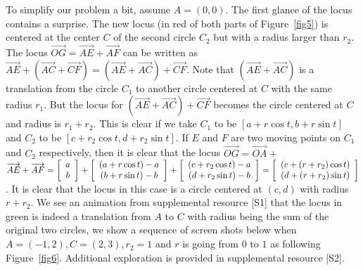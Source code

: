 \documentclass[12pt,a4paper]{article}%
\begin{document}
To simplify our problem a bit, assume $A=(0,0)$. The first
glance of the locus contains a surprise. The new locus (in red of both
parts of Figure~\ref{fig5})
is centered at the center $C$ of the second circle $C_2$ but with a
radius larger than $r_2$. The locus $\overrightarrow{OG}=\overrightarrow
{AE}+\overrightarrow{AF}$ can be written as $\overrightarrow{AE}+\left(
\overrightarrow{AC}+\overrightarrow{CF}\right)  =\left(  \overrightarrow
{AE}+\overrightarrow{AC}\right)  +\overrightarrow{CF}$. Note that $\left(
\overrightarrow{AE}+\overrightarrow{AC}\right)$ is a translation from the
circle $C_{1}$ to another circle centered at $C$ with the same radius $r_{1}$.
But the locus for $\left(  \overrightarrow{AE}+\overrightarrow{AC}\right)
+\overrightarrow{CF}$ becomes the circle centered at $C$ and radius is
$r_{1}+r_{2}$. This is clear if we take $C_{1}$ to be $[a+r\cos t, b+r\sin t]$ and
$C_{2}$ to be $[c+r_{2}\cos t, d+r_{2}\sin t]$. If $E$ and $F$ are two moving
points on $C_{1}$ and $C_{2}$ respectively, then it is clear that the locus
$\overrightarrow{OG}=\overrightarrow{OA}+$ $\overrightarrow{AE}+\overrightarrow{AF}
=\left[
\begin{array}
[c]{c}%
a\\
b
\end{array}
\right]  +\left[
\begin{array}
[c]{c}%
\left(  a+r\cos t\right)  -a\\
\left(  b+r\sin t\right)  -b
\end{array}
\right]  +\left[
\begin{array}
[c]{c}%
\left(  c+r_{2}\cos t\right)  -a\\
\left(  d+r_{2}\sin t\right)  -b
\end{array}
\right]  =\left[
\begin{array}
[c]{c}%
\left(  c+\left(  r+r_{2}\right)  \cos t\right) \\
\left(  d+\left(  r+r_{2}\right)  \sin t\right)
\end{array}
\right]$. It is clear that the locus in this case is a circle centered at
$(c,d)$ with radius $r+r_{2}.$ We see an animation from supplemental resource [S1]
that the locus in green is indeed a translation from $A$ to $C$ with radius
being the sum of the original two circles, we show a sequence of screen shots
below when $A=(-1,2),C=(2,3),r_{2}=1$ and $r$ is going from $0$ to $1$ as
following Figure~\ref{fig6}.
Additional exploration is provided in supplemental resource [S2].
\end{document}
